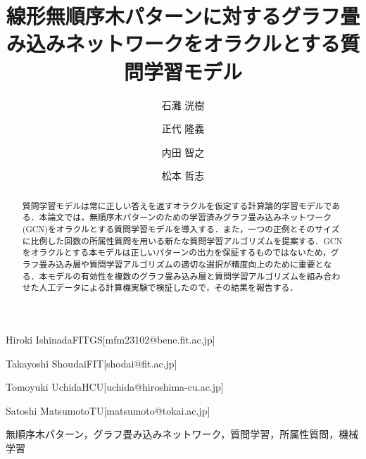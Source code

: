 \documentclass[submit]{ipsj}
\begin{document}
\title{線形無順序木パターンに対するグラフ畳み込みネットワークをオラクルとする質問学習モデル}


\author{石灘 洸樹}{Hiroki Ishinada}{FITGS}[mfm23102@bene.fit.ac.jp]
\author{正代 隆義}{Takayoshi Shoudai}{FIT}[shodai@fit.ac.jp]
\author{内田 智之}{Tomoyuki Uchida}{HCU}[uchida@hiroshima-cu.ac.jp]
\author{松本 哲志}{Satoshi Matsumoto}{TU}[matsumoto@tokai.ac.jp]

\begin{abstract}
	質問学習モデルは常に正しい答えを返すオラクルを仮定する計算論的学習モデルである．本論文では，無順序木パターンのための学習済みグラフ畳み込みネットワーク(GCN)をオラクルとする質問学習モデルを導入する．また，一つの正例とそのサイズに比例した回数の所属性質問を用いる新たな質問学習アルゴリズムを提案する．GCNをオラクルとする本モデルは正しいパターンの出力を保証するものではないため，グラフ畳み込み層や質問学習アルゴリズムの適切な選択が精度向上のために重要となる．本モデルの有効性を複数のグラフ畳み込み層と質問学習アルゴリズムを組み合わせた人工データによる計算機実験で検証したので，その結果を報告する．
\end{abstract}

\begin{jkeyword}
	無順序木パターン，グラフ畳み込みネットワーク，質問学習，所属性質問，機械学習
\end{jkeyword}
\end{document}
